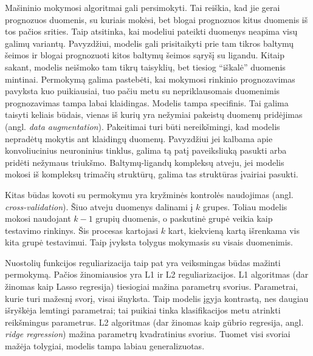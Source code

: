 Mašininio mokymosi algoritmai gali persimokyti.\cite{ragoza_proteinligand_2017} Tai reiškia, kad jie gerai prognozuos duomenis, su kuriais mokėsi, bet blogai prognozuos kitus duomenis iš tos pačios srities. Taip atsitinka, kai modeliui pateikti duomenys neapima visų galimų variantų. Pavyzdžiui, modelis gali prisitaikyti prie tam tikros baltymų šeimos ir blogai prognozuoti kitos baltymų šeimos sąryšį su ligandu. Kitaip sakant, modelis neišmoko tam tikrų taisyklių, bet tiesiog \enquote{iškalė} duomenis mintinai. Permokymą galima pastebėti, kai mokymosi rinkinio prognozavimas pavyksta kuo puikiausiai, tuo pačiu metu su nepriklausomais duomenimis prognozavimas tampa labai klaidingas. Modelis tampa specifinis.\cite{lehr_playing_2017} Tai galima taisyti keliais būdais, vienas iš kurių yra nežymiai pakeistų duomenų pridėjimas (angl. \textit{data augmentation}).\cite{ragoza_proteinligand_2017} Pakeitimai turi būti nereikšmingi, kad modelis nepradėtų mokytis ant klaidingų duomenų. Pavyzdžiui jei kalbama apie konvoliucinius neuroninius tinklus, galima tą patį paveiksliuką pasukti arba pridėti nežymaus triukšmo. Baltymų-ligandų kompleksų atveju, jei modelis mokosi iš kompleksų trimačių struktūrų, galima tas struktūras įvairiai pasukti. 

Kitas būdas kovoti su permokymu yra kryžminės kontrolės naudojimas (angl. \textit{cross-validation}).\cite{lehr_playing_2017}\cite{wojcikowski_performance_2017} Šiuo atveju duomenys dalinami į $k$ grupes. Toliau modelis mokosi naudojant $k-1$ grupių duomenis, o paskutinė grupė veikia kaip testavimo rinkinys. Šis procesas kartojasi $k$ kart, kiekvieną kartą išrenkama vis kita grupė testavimui. Taip įvyksta tolygus mokymasis su visais duomenimis.\cite{wojcikowski_performance_2017}

Nuostolių funkcijos reguliarizacija taip pat yra veiksmingas būdas mažinti permokymą. Pačios žinomiausios yra L1 ir L2 reguliarizacijos. L1 algoritmas (dar žinomas kaip Lasso regresija) tiesiogiai mažina parametrų svorius. Parametrai, kurie turi mažesnį svorį, visai išnyksta. Taip modelis įgyja kontrastą, nes daugiau išryškėja lemtingi parametrai; tai puikiai tinka klasifikacijos metu atrinkti reikšmingus parametrus. L2 algoritmas (dar žinomas kaip gūbrio regresija, angl. \textit{ridge regression}) mažina parametrų kvadratinius svorius. Tuomet visi svoriai mažėja tolygiai, modelis tampa labiau generalizuotas.\cite{stepniewska-dziubinska_development_2018}


